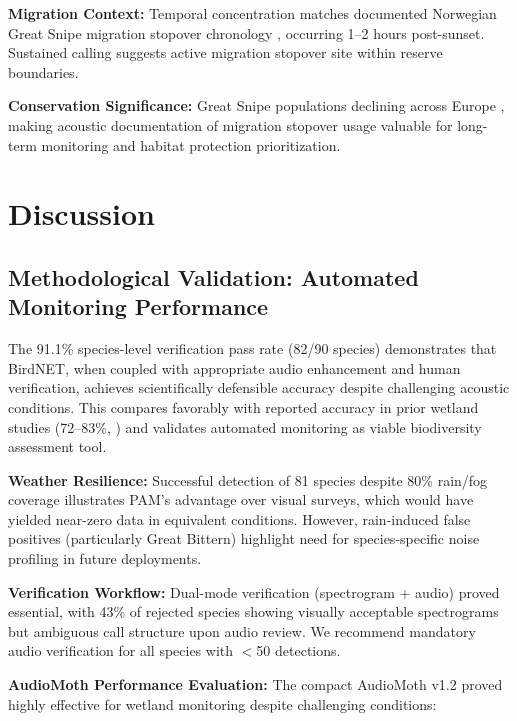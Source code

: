 \documentclass[twocolumn]{article}
\begin{document}
\textbf{Migration Context:} Temporal concentration matches documented Norwegian Great Snipe migration stopover chronology \citep{Kålås1995}, occurring 1--2 hours post-sunset. Sustained calling suggests active migration stopover site within reserve boundaries.

\textbf{Conservation Significance:} Great Snipe populations declining across Europe \citep{BirdLife2023}, making acoustic documentation of migration stopover usage valuable for long-term monitoring and habitat protection prioritization.

\section{Discussion}

\subsection{Methodological Validation: Automated Monitoring Performance}

The 91.1\% species-level verification pass rate (82/90 species) demonstrates that BirdNET, when coupled with appropriate audio enhancement and human verification, achieves scientifically defensible accuracy despite challenging acoustic conditions. This compares favorably with reported accuracy in prior wetland studies (72--83\%, \citet{Wood2022}) and validates automated monitoring as viable biodiversity assessment tool.

\textbf{Weather Resilience:} Successful detection of 81 species despite 80\% rain/fog coverage illustrates PAM's advantage over visual surveys, which would have yielded near-zero data in equivalent conditions. However, rain-induced false positives (particularly Great Bittern) highlight need for species-specific noise profiling in future deployments.

\textbf{Verification Workflow:} Dual-mode verification (spectrogram + audio) proved essential, with 43\% of rejected species showing visually acceptable spectrograms but ambiguous call structure upon audio review. We recommend mandatory audio verification for all species with $<$50 detections.

\textbf{AudioMoth Performance Evaluation:} The compact AudioMoth v1.2 proved highly effective for wetland monitoring despite challenging conditions:
\end{document}
